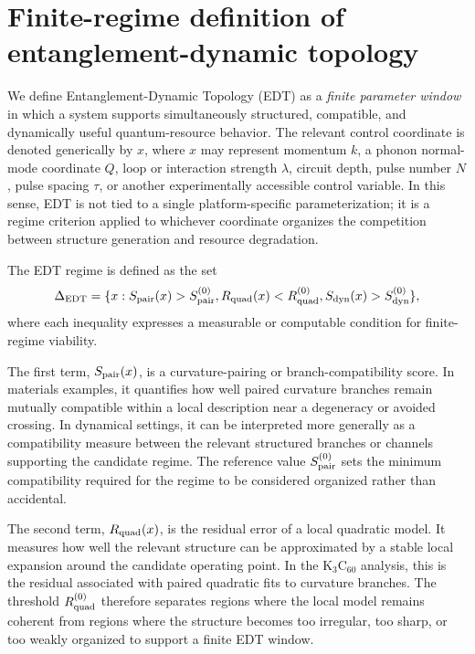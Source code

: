 \section{Finite-regime definition of entanglement-dynamic topology}

We define Entanglement-Dynamic Topology (EDT) as a \emph{finite parameter window} in which a system supports simultaneously structured, compatible, and dynamically useful quantum-resource behavior. The relevant control coordinate is denoted generically by $x$, where $x$ may represent momentum $k$, a phonon normal-mode coordinate $Q$, loop or interaction strength $\lambda$, circuit depth, pulse number $N$, pulse spacing $\tau$, or another experimentally accessible control variable. In this sense, EDT is not tied to a single platform-specific parameterization; it is a regime criterion applied to whichever coordinate organizes the competition between structure generation and resource degradation.

The EDT regime is defined as the set
\begin{equation}
\Delta_{\rm EDT}
=
\{x: S_{\rm pair}(x) > S_{\rm pair}^{(0)},
R_{\rm quad}(x) < R_{\rm quad}^{(0)},
S_{\rm dyn}(x) > S_{\rm dyn}^{(0)} \},
\end{equation}
where each inequality expresses a measurable or computable condition for finite-regime viability.

The first term, $S_{\rm pair}(x)$, is a curvature-pairing or branch-compatibility score. In materials examples, it quantifies how well paired curvature branches remain mutually compatible within a local description near a degeneracy or avoided crossing. In dynamical settings, it can be interpreted more generally as a compatibility measure between the relevant structured branches or channels supporting the candidate regime. The reference value $S_{\rm pair}^{(0)}$ sets the minimum compatibility required for the regime to be considered organized rather than accidental.

The second term, $R_{\rm quad}(x)$, is the residual error of a local quadratic model. It measures how well the relevant structure can be approximated by a stable local expansion around the candidate operating point. In the K$_3$C$_{60}$ analysis, this is the residual associated with paired quadratic fits to curvature branches. The threshold $R_{\rm quad}^{(0)}$ therefore separates regions where the local model remains coherent from regions where the structure becomes too irregular, too sharp, or too weakly organized to support a finite EDT window.

